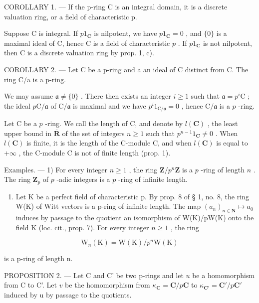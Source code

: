 COROLLARY 1. --- If the p-ring C is an integral domain, it is a discrete valuation ring, or a field of characteristic p.

Suppose C is integral. If \(p1_{\mathbf{C}}\) is nilpotent, we have \(p1_{\mathbf{C}} = 0\) , and \(\{0\}\) is a maximal ideal of C, hence C is a field of characteristic \(p\) . If \(p1_{\mathbf{C}}\) is not nilpotent, then C is a discrete valuation ring by prop. 1, c).

COROLLARY 2. --- Let C be a p-ring and a an ideal of C distinct from C. The ring C/a is a p-ring.

We may assume \(\mathfrak{a} \neq \{0\}\) . There then exists an integer \(i \geqslant 1\) such that \(\mathfrak{a} = p^i\mathrm{C}\) ; the ideal \(p\mathrm{C} / \mathfrak{a}\) of \(\mathrm{C} / \mathfrak{a}\) is maximal and we have \(p^i1_{\mathrm{C} / \mathfrak{a}} = 0\) , hence \(\mathrm{C} / \mathfrak{a}\) is a \(p\) -ring.

Let C be a \(p\) -ring. We call the length of C, and denote by \(l(\mathbf{C})\) , the least upper bound in \(\overline{\mathbf{R}}\) of the set of integers \(n \geqslant 1\) such that \(p^{n-1}1_{\mathbf{C}} \neq 0\) . When \(l(\mathbf{C})\) is finite, it is the length of the C-module C, and when \(l(\mathbf{C})\) is equal to \(+\infty\) , the C-module C is not of finite length (prop. 1).

Examples. --- 1) For every integer \(n \geqslant 1\) , the ring \(\mathbf{Z}/p^{n}\mathbf{Z}\) is a \(p\) -ring of length \(n\) . The ring \(\mathbf{Z}_{p}\) of \(p\) -adic integers is a \(p\) -ring of infinite length.

\begin{enumerate}
\def\labelenumi{\arabic{enumi})}
\setcounter{enumi}{1}
\tightlist
\item
  Let K be a perfect field of characteristic p. By prop. 8 of § 1, no. 8, the ring W(K) of Witt vectors is a p-ring of infinite length. The map \((a_{n})_{n\in\mathbf{N}} \mapsto a_{0}\) induces by passage to the quotient an isomorphism of W(K)/pW(K) onto the field K (loc. cit., prop. 7). For every integer \(n \geqslant 1\) , the ring
\end{enumerate}

\[
\mathrm{W} _ {n} (\mathrm{K}) = \mathrm{W} (\mathrm{K}) / p ^ {n} \mathrm{W} (\mathrm{K})
\]

is a p-ring of length n.

PROPOSITION 2. --- Let C and C' be two p-rings and let \(u\) be a homomorphism from C to C'. Let \(v\) be the homomorphism from \(\kappa_{\mathbf{C}} = \mathbf{C} / p\mathbf{C}\) to \(\kappa_{\mathbf{C}'} = \mathbf{C}' / p\mathbf{C}'\) induced by u by passage to the quotients.

